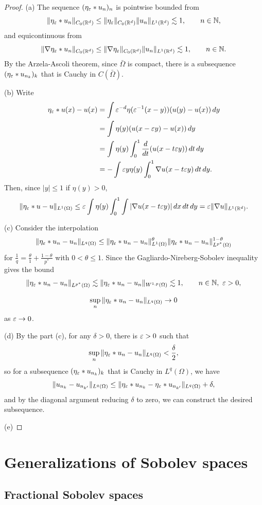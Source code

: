\documentclass{../../large}
\begin{document}
\begin{proof}
(a)
The sequence $(\eta_\varepsilon*u_n)_n$ is pointwise bounded from
\[\|\eta_\varepsilon*u_n\|_{C_0(\mathbb{R}^d)}\le\|\eta_\varepsilon\|_{C_0(\mathbb{R}^d)}\|u_n\|_{L^1(\mathbb{R}^d)}\lesssim1,\qquad n\in\mathbb{N},\]
and equicontinuous from
\[\|\nabla\eta_\varepsilon*u_n\|_{C_0(\mathbb{R}^d)}\le\|\nabla\eta_\varepsilon\|_{C_0(\mathbb{R}^d)}\|u_n\|_{L^1(\mathbb{R}^d)}\lesssim1,\qquad n\in\mathbb{N}.\]
By the Arzela-Ascoli theorem, since $\bar\Omega$ is compact, there is a subsequence $(\eta_\varepsilon*u_{n_k})_k$ that is Cauchy in $C(\bar\Omega)$.

(b)
Write
\begin{align*}
\eta_\e*u(x)-u(x)
&=\int\e^{-d}\eta(\e^{-1}(x-y))(u(y)-u(x))\,dy\\
&=\int\eta(y)(u(x-\e y)-u(x))\,dy\\
&=\int\eta(y)\int_0^1\dd{t}(u(x-t\e y))\,dt\,dy\\
&=-\int\e y\eta(y)\int_0^1\nabla u(x-t\e y)\,dt\,dy.
\end{align*}
Then, since $|y|\le1$ if $\eta(y)>0$,
\[\|\eta_\varepsilon*u-u\|_{L^1(\Omega)}\le\varepsilon\int\eta(y)\int_0^1\int|\nabla u(x-t\varepsilon y)|\,dx\,dt\,dy=\varepsilon\|\nabla u\|_{L^1(\mathbb{R}^d)}.\]

(c)
Consider the interpolation
\[\|\eta_\varepsilon*u_n-u_n\|_{L^q(\Omega)}\le\|\eta_\varepsilon*u_n-u_n\|_{L^1(\Omega)}^\theta\|\eta_\varepsilon*u_n-u_n\|_{L^{p^*}(\Omega)}^{1-\theta}\]
for $\frac1q=\frac\theta1+\frac{1-\theta}{p^*}$ with $0<\theta\le1$.
Since the Gagliardo-Nireberg-Sobolev inequality gives the bound
\[\|\eta_\varepsilon*u_n-u_n\|_{L^{p^*}(\Omega)}\lesssim\|\eta_\varepsilon*u_n-u_n\|_{W^{1,p}(\Omega)}\lesssim1,\qquad n\in\mathbb{N},\ \varepsilon>0,\]

\[\sup_n\|\eta_\varepsilon*u_n-u_n\|_{L^q(\Omega)}\to0\]
as $\varepsilon\to0$.

(d)
By the part (c), for any $\delta>0$, there is $\varepsilon>0$ such that
\[\sup_n\|\eta_\varepsilon*u_n-u_n\|_{L^q(\Omega)}<\frac\delta2,\]
so for a subsequence $(\eta_\varepsilon*u_{n_k})_k$ that is Cauchy in $L^q(\Omega)$, we have
\[\|u_{n_k}-u_{n_{k'}}\|_{L^q(\Omega)}\le\|\eta_\varepsilon*u_{n_k}-\eta_\varepsilon*u_{n_{k'}}\|_{L^q(\Omega)}+\delta,\]
and by the diagonal argument reducing $\delta$ to zero, we can construct the desired subsequence.

(e)
\end{proof}




\chapter{Generalizations of Sobolev spaces}
\section{Fractional Sobolev spaces}
\end{document}
